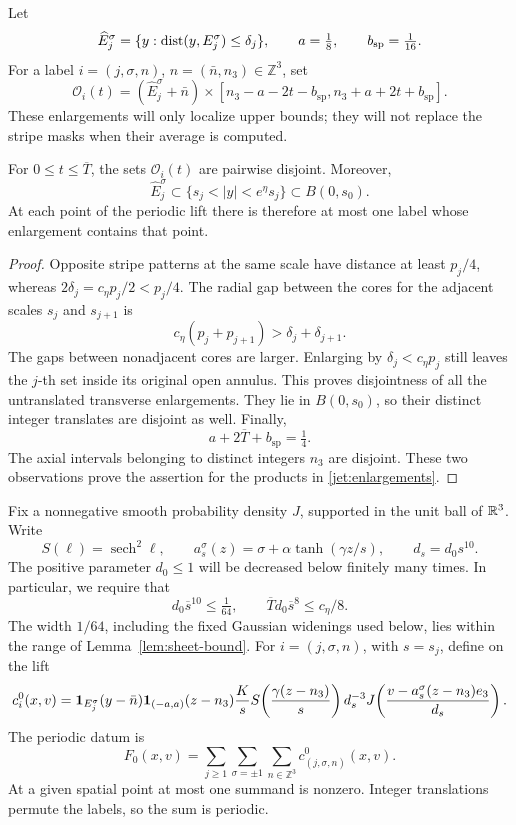 Let
\[
 \widehat E_j^\sigma
   =\{y:\operatorname{dist}(y,E_j^\sigma)\le\delta_j\},
 \qquad a=\tfrac18,\qquad b_{\mathrm{sp}}=\tfrac1{16}.
\]
For a label \(i=(j,\sigma,n)\), \(n=(\bar n,n_3)\in\mathbb Z^3\), set
\begin{equation}
 \mathcal O_i(t)=
 (\widehat E_j^\sigma+\bar n)
 \times[n_3-a-2t-b_{\mathrm{sp}},
        n_3+a+2t+b_{\mathrm{sp}}].
 \label{jet:enlargements}
\end{equation}
These enlargements will only localize upper bounds; they will not
replace the stripe masks when their average is computed.

\begin{lemma}
\label{jet:geometry}
For \(0\le t\le\overline T\), the sets \(\mathcal O_i(t)\) are
pairwise disjoint.  Moreover,
\[
 \widehat E_j^\sigma\subset
 \{s_j<|y|<e^\eta s_j\}\subset B(0,s_0).
\]
At each point of the periodic lift there is therefore at most one
label whose enlargement contains that point.
\end{lemma}

\begin{proof}
Opposite stripe patterns at the same scale have distance at least
\(p_j/4\), whereas \(2\delta_j=c_\eta p_j/2<p_j/4\).
The radial gap between the cores for the adjacent scales \(s_j\)
and \(s_{j+1}\) is
\[
 c_\eta(p_j+p_{j+1})
   >\delta_j+\delta_{j+1}.
\]
The gaps between nonadjacent cores are larger.  Enlarging by
\(\delta_j<c_\eta p_j\) still leaves the \(j\)-th set inside its
original open annulus.  This proves disjointness of all the
untranslated transverse enlargements.  They lie in \(B(0,s_0)\),
so their distinct integer translates are disjoint as well.
Finally,
\[
 a+2\overline T+b_{\mathrm{sp}}=\tfrac14.
\]
The axial intervals belonging to distinct integers \(n_3\) are
disjoint.  These two observations prove the assertion for the
products in \eqref{jet:enlargements}.
\end{proof}

Fix a nonnegative smooth probability density \(J\), supported in the
unit ball of \(\mathbb R^3\).  Write
\[
 S(\ell)=\operatorname{sech}^2\ell,\qquad
 a_s^\sigma(z)=\sigma+\alpha\tanh(\gamma z/s),
 \qquad d_s=d_0s^{10}.
\]
The positive parameter \(d_0\le1\) will be decreased below finitely
many times.  In particular, we require that
\begin{equation}
 d_0\overline s^{10}\le\tfrac1{64},\qquad
 \overline T d_0\overline s^8\le c_\eta/8 .
 \label{jet:thermal-preliminary}
\end{equation}
The width \(1/64\), including the fixed Gaussian widenings used
below, lies within the range of Lemma~\ref{lem:sheet-bound}.
For \(i=(j,\sigma,n)\), with \(s=s_j\), define on the lift
\[
 c_i^0(x,v)=
 \mathbf 1_{E_j^\sigma}(y-\bar n)\mathbf 1_{(-a,a)}(z-n_3)
 \frac K s S\!\left(\frac{\gamma(z-n_3)}s\right)d_s^{-3}
 J\!\left(\frac{v-a_s^\sigma(z-n_3)e_3}{d_s}\right).
\]
The periodic datum is
\begin{equation}
 F_0(x,v)=\sum_{j\ge1}\sum_{\sigma=\pm1}
                 \sum_{n\in\mathbb Z^3}c_{(j,\sigma,n)}^0(x,v).
 \label{eq:datum}
\end{equation}
At a given spatial point at most one summand is nonzero.  Integer
translations permute the labels, so the sum is periodic.

